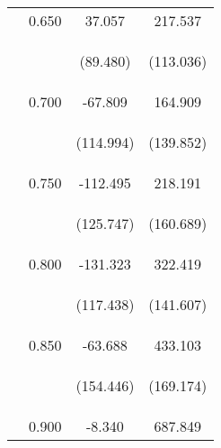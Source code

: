 \begin{tabular}{lccc}
\noalign{\smallskip} & 0.650 & 37.057 & 217.537\\
 & \begin{footnotesize}\end{footnotesize} & \begin{footnotesize}(89.480)\end{footnotesize} & \begin{footnotesize}(113.036)\end{footnotesize}\\
\noalign{\smallskip} & 0.700 & -67.809 & 164.909\\
 & \begin{footnotesize}\end{footnotesize} & \begin{footnotesize}(114.994)\end{footnotesize} & \begin{footnotesize}(139.852)\end{footnotesize}\\
\noalign{\smallskip} & 0.750 & -112.495 & 218.191\\
 & \begin{footnotesize}\end{footnotesize} & \begin{footnotesize}(125.747)\end{footnotesize} & \begin{footnotesize}(160.689)\end{footnotesize}\\
\noalign{\smallskip} & 0.800 & -131.323 & 322.419\\
 & \begin{footnotesize}\end{footnotesize} & \begin{footnotesize}(117.438)\end{footnotesize} & \begin{footnotesize}(141.607)\end{footnotesize}\\
\noalign{\smallskip} & 0.850 & -63.688 & 433.103\\
 & \begin{footnotesize}\end{footnotesize} & \begin{footnotesize}(154.446)\end{footnotesize} & \begin{footnotesize}(169.174)\end{footnotesize}\\
\noalign{\smallskip} & 0.900 & -8.340 & 687.849\\

\end{tabular}
